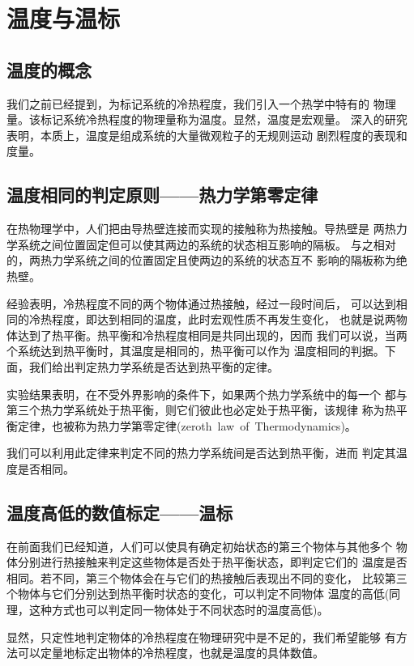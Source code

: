 \section{温度与温标}
\subsection{温度的概念}
我们之前已经提到，为标记系统的冷热程度，我们引入一个热学中特有的
物理量。该标记系统冷热程度的物理量称为温度。显然，温度是宏观量。
深入的研究表明，本质上，温度是组成系统的大量微观粒子的无规则运动
剧烈程度的表现和度量。
\subsection{温度相同的判定原则——热力学第零定律}
在热物理学中，人们把由导热壁连接而实现的接触称为热接触。导热壁是
两热力学系统之间位置固定但可以使其两边的系统的状态相互影响的隔板。
与之相对的，两热力学系统之间的位置固定且使两边的系统的状态互不
影响的隔板称为绝热壁。

经验表明，冷热程度不同的两个物体通过热接触，经过一段时间后，
可以达到相同的冷热程度，即达到相同的温度，此时宏观性质不再发生变化，
也就是说两物体达到了热平衡。热平衡和冷热程度相同是共同出现的，因而
我们可以说，当两个系统达到热平衡时，其温度是相同的，热平衡可以作为
温度相同的判据。下面，我们给出判定热力学系统是否达到热平衡的定律。

\begin{theorem}
    实验结果表明，在不受外界影响的条件下，如果两个热力学系统中的每一个
    都与第三个热力学系统处于热平衡，则它们彼此也必定处于热平衡，该规律
    称为热平衡定律，也被称为热力学第零定律(zeroth~law~of~Thermodynamics)。
\end{theorem}
我们可以利用此定律来判定不同的热力学系统间是否达到热平衡，进而
判定其温度是否相同。

\subsection{温度高低的数值标定——温标}
在前面我们已经知道，人们可以使具有确定初始状态的第三个物体与其他多个
物体分别进行热接触来判定这些物体是否处于热平衡状态，即判定它们的
温度是否相同。若不同，第三个物体会在与它们的热接触后表现出不同的变化，
比较第三个物体与它们分别达到热平衡时状态的变化，可以判定不同物体
温度的高低(同理，这种方式也可以判定同一物体处于不同状态时的温度高低)。

显然，只定性地判定物体的冷热程度在物理研究中是不足的，我们希望能够
有方法可以定量地标定出物体的冷热程度，也就是温度的具体数值。

